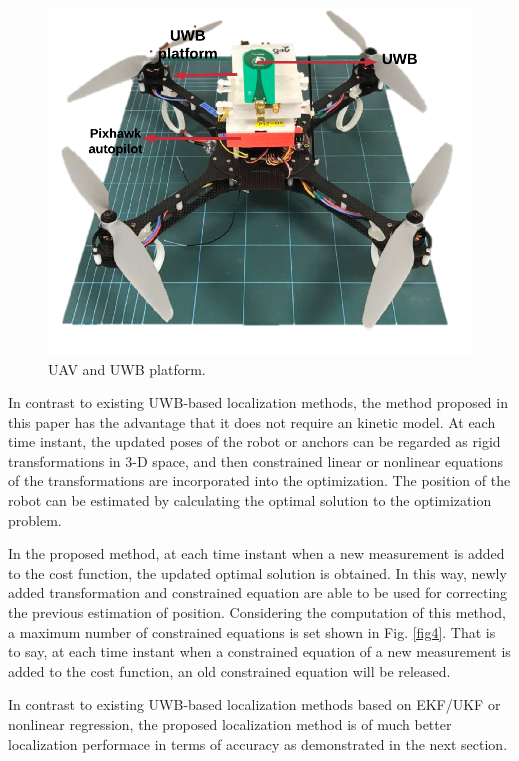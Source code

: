 \documentclass[journal]{IEEEtran}
\begin{document}
\begin{figure}[!t]
	\centering
	\includegraphics[width=1\linewidth]{pic/uav.pdf}
	\caption{UAV and UWB platform.}
	\label{fig5}
\end{figure}

In contrast to existing UWB-based localization methods, the method proposed in this paper has the advantage that it does not require an kinetic model. At each time instant, the updated poses of the robot or anchors can be regarded as rigid transformations in 3-D space, and then constrained linear or nonlinear equations of the transformations are incorporated into the optimization. The position of the robot can be estimated by calculating the optimal solution to the optimization problem.

In the proposed method, at each time instant when a new measurement is added to the cost function, the updated optimal solution is obtained. In this way, newly added transformation and constrained equation are able to be used for correcting the previous estimation of position. Considering the computation of this method, a maximum number of constrained equations is set shown in Fig. \ref{fig4}. That is to say, at each time instant when a constrained equation of a new measurement is added to the cost function, an old constrained equation will be released.

In contrast to existing UWB-based localization methods based on EKF/UKF or nonlinear regression, the proposed localization method is of much better localization performace in terms of accuracy as demonstrated in the next section.
\end{document}
